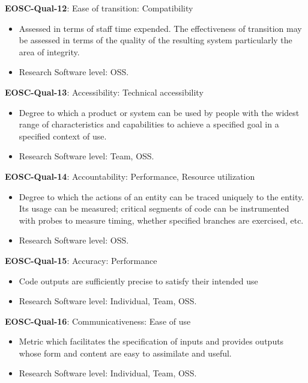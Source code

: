 \textbf{EOSC-Qual-12}: Ease of transition: Compatibility

\begin{itemize}
    \item Assessed in terms of staff time expended. The effectiveness of transition may be assessed in terms of the quality of the resulting system particularly the area of integrity. \cite{iso_25010_2011_2017,gillies_modelling_1992}
    \item Research Software level: OSS.
\end{itemize}

\textbf{EOSC-Qual-13}: Accessibility: Technical accessibility

\begin{itemize}
    \item Degree to which a product or system can be used by people with the widest range of characteristics and
capabilities to achieve a specified goal in a specified context of use. \cite{iso_25010_2011_2017,boehm_quantitative_1976}
    \item Research Software level: Team, OSS.
\end{itemize}

\textbf{EOSC-Qual-14}: Accountability: Performance, Resource utilization

\begin{itemize}
    \item Degree to which the actions of an entity can be traced uniquely to the entity. Its usage can be measured; critical segments of code can be instrumented with probes to measure timing, whether specified branches are exercised, etc. \cite{iso_25010_2011_2017,boehm_quantitative_1976}
    \item Research Software level: OSS.
\end{itemize}

\textbf{EOSC-Qual-15}: Accuracy: Performance

\begin{itemize}
    \item Code outputs are sufficiently precise to satisfy their intended use \cite{boehm_quantitative_1976}
    \item Research Software level: Individual, Team, OSS.
\end{itemize}

\textbf{EOSC-Qual-16}: Communicativeness: Ease of use

\begin{itemize}
    \item Metric which facilitates the specification of inputs and provides outputs whose form and content are easy to assimilate and useful. \cite{boehm_quantitative_1976,raymond_software_2013}
    \item Research Software level: Individual, Team, OSS.
\end{itemize}

